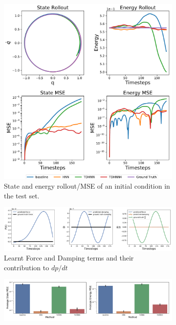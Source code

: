 \documentclass[twoside]{article}
\begin{document}
\begin{figure}[h!]
\centering
\captionsetup{justification=centering}
	\begin{subfigure}[b]{0.4\textwidth}
		\centering
		\includegraphics[width=\textwidth]{figures/mass_spring_long.pdf}
		\caption{State and energy rollout/MSE of an initial condition in the test set.}
	\end{subfigure}
	\begin{subfigure}[b]{0.48\textwidth}
		\centering
		\includegraphics[width=\textwidth]{figures/dpdt_mass_spring.pdf}
		\caption{Learnt Force and Damping terms and their contribution to $dp/dt$}
	\end{subfigure}
	\begin{subfigure}[b]{0.48\textwidth}
	    \centering
		\includegraphics[width=\textwidth]{figures/mass_spring_errors.pdf}

\end{subfigure}
\end{figure}
\end{document}
